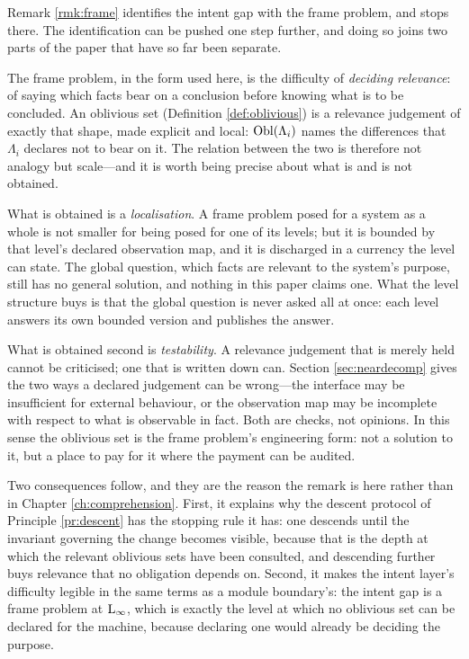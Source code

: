\begin{remark}\label{rmk:frame-per-level}
Remark \ref{rmk:frame} identifies the intent gap with the frame problem, and stops there. The
identification can be pushed one step further, and doing so joins two parts of the paper that have so
far been separate.

The frame problem, in the form used here, is the difficulty of \emph{deciding relevance}: of saying
which facts bear on a conclusion before knowing what is to be concluded. An oblivious set
(Definition \ref{def:oblivious}) is a relevance judgement of exactly that shape, made explicit and
local: $\operatorname{Obl}(\Lambda_i)$ names the differences that $\Lambda_i$ declares not to bear on it. The
relation between the two is therefore not analogy but scale---and it is worth being precise about
what is and is not obtained.

What is obtained is a \emph{localisation}. A frame problem posed for a system as a whole is not
smaller for being posed for one of its levels; but it is bounded by that level's declared
observation map, and it is discharged in a currency the level can state. The global question, which
facts are relevant to the system's purpose, still has no general solution, and nothing in this paper
claims one. What the level structure buys is that the global question is never asked all at once:
each level answers its own bounded version and publishes the answer.

What is obtained second is \emph{testability}. A relevance judgement that is merely held cannot be
criticised; one that is written down can. Section \ref{sec:neardecomp} gives the two ways a declared
judgement can be wrong---the interface may be insufficient for external behaviour, or the observation
map may be incomplete with respect to what is observable in fact. Both are checks, not opinions. In
this sense the oblivious set is the frame problem's engineering form: not a solution to it, but a
place to pay for it where the payment can be audited.

Two consequences follow, and they are the reason the remark is here rather than in Chapter
\ref{ch:comprehension}. First, it explains why the descent protocol of Principle \ref{pr:descent} has
the stopping rule it has: one descends until the invariant governing the change becomes visible,
because that is the depth at which the relevant oblivious sets have been consulted, and descending
further buys relevance that no obligation depends on. Second, it makes the intent layer's
difficulty legible in the same terms as a module boundary's: the intent gap is a frame problem at
$\mathrm{L}_{\infty}$, which is exactly the level at which no oblivious set can be declared for the machine,
because declaring one would already be deciding the purpose.
\end{remark}

